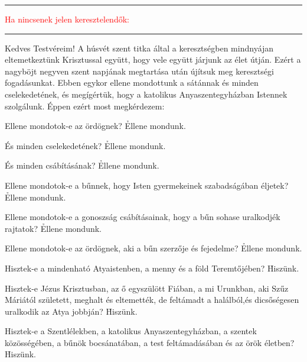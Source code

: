 \documentclass[twoside]{article}
\begin{document}

\noindent\textcolor{red}{\rule{\linewidth}{0.5pt}}

\textcolor{red}{Ha nincsenek jelen keresztelendők:}


\noindent\textcolor{red}{\rule{\linewidth}{0.5pt}}



\p Kedves Testvéreim! A húsvét szent titka által a keresztségben mindnyájan eltemetkeztünk Krisztussal
együtt, hogy vele együtt járjunk az élet útján. Ezért a nagyböjt negyven szent napjának megtartása
után újítsuk meg keresztségi fogadásunkat. Ebben egykor ellene mondottunk a sátánnak és minden
cselekedetének, és megígértük, hogy a katolikus Anyaszentegyházban Istennek szolgálunk. Éppen ezért
most megkérdezem:

\p Ellene mondotok-e az ördögnek? \h Ellene mondunk.

\p És minden cselekedetének? \h Ellene mondunk.

\p És minden csábításának? \h Ellene mondunk.


\p Ellene mondotok-e a bűnnek, hogy Isten gyermekeinek szabadságában éljetek? \h Ellene mondunk.

\p Ellene mondotok-e a gonoszság csábításainak, hogy a bűn sohase uralkodjék rajtatok? \h Ellene mondunk.

\p Ellene mondotok-e az ördögnek, aki a bűn szerzője és fejedelme? \h Ellene mondunk.


\p Hisztek-e a mindenható Atyaistenben, a menny és a föld Teremtőjében? \h Hi\-szünk.

\p Hisztek-e Jézus Krisztusban, az ő egyszülött Fiában, a mi Urunkban, aki Szűz Máriától született,
meghalt és eltemették, de feltámadt a halálból,és dicsőségesen uralkodik az Atya jobbján? \h
Hiszünk.

\p Hisztek-e a Szentlélekben, a katolikus Anyaszentegyházban, a szentek közössé\-gében, a bűnök
bocsánatában, a test feltámadásában és az örök életben? \h Hi\-szünk.
\end{document}
